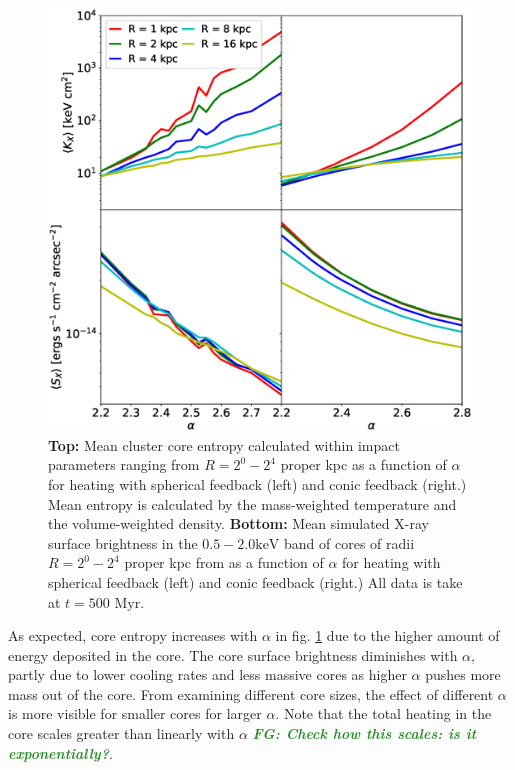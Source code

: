 \documentclass[iop,apjl, twocolappendix]{emulateapj}   %
\def\FG#1{{\textcolor{ForestGreen}{\textbf{\textit{ FG: #1}}}}}
\begin{document}
\begin{figure}
	\begin{center}
		\includegraphics[width=1\linewidth]{figures/allValpha.eps}
	\end{center}
	\caption{
    \label{fig:allValpha}
    \textbf{Top:}  Mean cluster core entropy calculated within impact
    parameters ranging from $R = 2^0 - 2^4$ proper kpc as a function of
    $\alpha$ for heating with spherical feedback (left) and conic feedback
    (right.) Mean entropy is calculated by the mass-weighted temperature and the
    volume-weighted density.
    \textbf{Bottom:}	Mean simulated X-ray surface brightness in the $0.5 - 2.0
    \text{keV}$ band of cores of radii $R = 2^0 - 2^4$ proper kpc from as a
    function of $\alpha$ for heating with spherical feedback (left) and conic
    feedback (right.) All data is take at $t= 500 \text{ Myr}$.}
\end{figure}

As expected, core entropy increases with $\alpha$ in fig. \ref{fig:allValpha}
due to the higher amount of energy deposited in the core. The core surface
brightness diminishes with $\alpha$, partly due to lower cooling rates and less
massive cores as higher $\alpha$ pushes more mass out of the core. From
examining different core sizes, the effect of different $\alpha$ is more
visible for smaller cores for larger $\alpha$. Note that the total heating in
the core scales greater than linearly with $\alpha$ \FG{Check how this scales:
is it exponentially?}.
\end{document}
